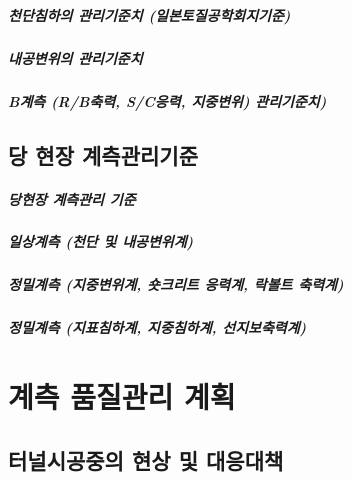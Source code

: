 		\paragraph{천단침하의 관리기준치 (일본토질공학회지기준)}
		
		\paragraph{내공변위의 관리기준치}
		

		\paragraph{B계측 (R/B축력, S/C응력, 지중변위) 관리기준치)}
		
		
		
	\section{당 현장 계측관리기준}
			
		\paragraph{당현장 계측관리 기준}
		
		\paragraph{일상계측 (천단 및 내공변위계)}
		
		\paragraph{정밀계측 (지중변위계, 숏크리트 응력계, 락볼트 축력계)}

		\paragraph{정밀계측 (지표침하계, 지중침하계, 선지보축력계)}


	\chapter{계측 품질관리 계획}
	\minitoc				%
	
	\section{터널시공중의 현상 및 대응대책}
	
